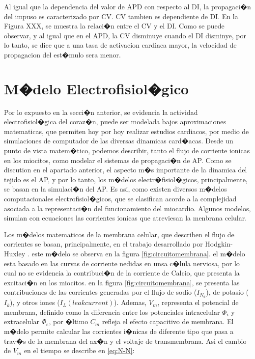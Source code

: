Al igual que la dependencia del valor de \ac{APD} con respecto al \ac{DI},  la
propagaci�n del impuso es caracterizado por \acf{CV}. \ac{CV} tambien 
es dependiente de \ac{DI}. En la Figura XXX, se muestra la relaci�n entre el
\ac{CV} y el \ac{DI}. Como se puede observar, y al igual que en el \ac{APD}, la
\ac{CV} disminuye cuando el \ac{DI} disminye, por lo tanto, se dice que a una
tasa de activacion cardiaca mayor, la velocidad de propagacion del est�mulo sera
menor.


\section{M�delo Electrofisiol�gico} \label{sec:modelElectrofi}

Por lo expuesto en la secci�n anterior, se evidencia la actividad
electrofisiol�gica del coraz�n, puede ser  modelada bajos aproximaciones
matematicas, que permiten hoy por hoy realizar estudios cardiacos, por medio de
simulaciones de computador de las diversas dinamicas card�acas. Desde un punto
de vista matem�tico, podemos describir, tanto el flujo de corriente ionicas en
los miocitos, como modelar el sistemas de propagaci�n de \ac{AP}. Como se discution en el apartado
anterior, el aspecto m�s importante de la dinamica del tejido es el \ac{AP}, y 
por lo tanto, los m�delos  electr�fisiol�gicos, principalmente, se basan  en la
simulaci�n del \ac{AP}. Es asi, como existen diversos m�delos computacionales 
electrofisiol�gicos, que se clasifican acorde  a la complejidad asociada a la
representaci�n del funcionamiento del miocardio. Algunos modelos, simulan con
ecuaciones las corrientes ionicas que atreviesan la menbrana celular.

 
Los m�delos matematicos de la membrana celular, que describen el
flujo de corrientes se basan, principalmente, en el 
trabajo desarrollado por Hodgkin-Huxley \cite{Hodgkin52}. este m�delo se observa
en la figura \ref{fig:circuitomembrana}. el m�delo esta  basado en las curvas de corriente 
nedidas en unsa c�lula nerviosa, por lo cual no se evidencia la contribuci�n de
la corriente de Calcio, que presenta la excitaci�n en los miocitos. en la figura 
\ref{fig:circuitomembrana}, se presenta las contribuciones de las corrientes
generadas por el flujo de sodio ($I_{N_a}$), de potasio ($I_{k}$),  y otros
iones ($I_L (leak current)$). Ademas,  $V_m$,  representa el potencial de
membrana, definido como la diferencia entre los potenciales intracelular
$\Phi_i$ y extracelular $\Phi_e$, por �ltimo $C_m$ refleja el efecto
capacitivo de membrana. El m�delo permite calcular las corrientes i�nicas de
diferente tipo que pasa a trav�s de la membrana del ax�n y el voltaje de
transmembrana. Asi el cambio  de $V_m$ en el tiempo se describe en 
 \ref{eq:N-N}:

